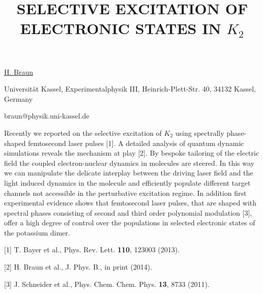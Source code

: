 \title{SELECTIVE EXCITATION OF ELECTRONIC STATES IN $K_2$}

\underline{H. Braun} 

{\normalsize{\vspace{-4mm}
Universit\"at Kassel,
Experimentalphysik III,
Heinrich-Plett-Str. 40,
34132 Kassel,
Germany

\email braun@physik.uni-kassel.de}}

Recently we reported on the selective excitation of $K_2$ using spectrally phase-shaped femtosecond laser pulses [1]. A detailed analysis of quantum dynamic simulations reveals the mechanism at play [2]. By bespoke tailoring of the electric field the coupled electron-nuclear dynamics in molecules are steered. In this way we can manipulate the delicate interplay between the driving laser field and the light induced dynamics in the molecule and efficiently populate different target channels not accessible in the perturbative excitation regime. In addition first experimental evidence shows that femtosecond laser pulses, that are shaped with spectral phases consisting of second and third order polynomial modulation [3], offer a high degree of control over the populations in selected electronic states of the potassium dimer.

{\normalsize
[1] T. Bayer et al., Phys. Rev. Lett. \textbf{110}, 123003 (2013).
\vsp

[2] H. Braun et al., J. Phys. B., in print (2014).
\vsp

[3] J. Schneider et al., Phys. Chem. Chem. Phys. \textbf{13}, 8733 (2011).
}

\vspace{\baselineskip}
